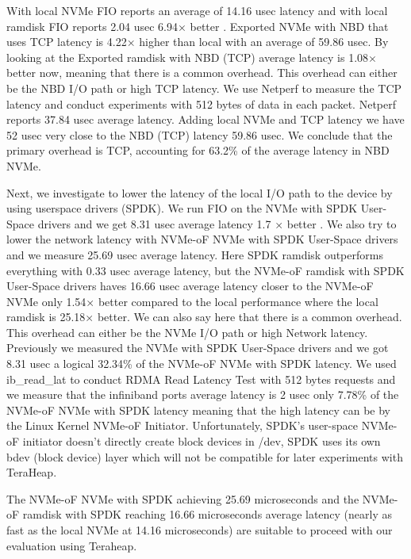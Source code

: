 With local NVMe  FIO reports an average of 14.16 usec  latency and
with local ramdisk FIO reports 2.04 usec 6.94× better . Exported NVMe  with NBD that uses TCP
 latency is 4.22× higher
than local with an average of 59.86 usec. By
looking at the Exported ramdisk with NBD (TCP) average latency  is 1.08$\times$ better now, meaning that
there is a common overhead. This overhead can either be the NBD I/O path or high
TCP latency. We use Netperf to measure the TCP latency and conduct experiments
with 512 bytes of data in each packet. Netperf reports 37.84 usec average
latency. Adding local NVMe and TCP latency we have 52 usec very close to the NBD
(TCP) latency 59.86 usec. We conclude that the primary overhead is TCP,
accounting for 63.2\% of the average latency in NBD NVMe.

Next, we investigate to lower the latency of the local I/O path to the device by
using userspace drivers (SPDK). We run FIO on the NVMe with SPDK User-Space
drivers and we get 8.31 usec average latency 1.7 × better . We also try to lower
the network latency with NVMe-oF NVMe with SPDK User-Space drivers and we
measure 25.69 usec average latency. Here SPDK ramdisk outperforms everything
with 0.33 usec average latency, but the NVMe-oF ramdisk with SPDK User-Space
drivers haves 16.66 usec average latency closer to the NVMe-oF NVMe only 1.54×
better compared to the local performance where the local ramdisk is 25.18×
better. We can also say here that there is a common overhead. This overhead can
either be the NVMe I/O path or high Network latency. Previously we measured the
NVMe with SPDK User-Space drivers and we got 8.31 usec a logical 32.34\% of the
NVMe-oF NVMe with SPDK latency. We used ib\_read\_lat to conduct RDMA Read
Latency Test with 512 bytes requests and we measure that the infiniband ports
average latency is 2 usec only 7.78\% of the NVMe-oF NVMe with SPDK latency
meaning that the high latency can be by the Linux Kernel NVMe-oF Initiator.
Unfortunately, SPDK's user-space NVMe-oF initiator doesn't directly create block
devices in /dev, SPDK uses its own bdev (block device) layer which will not be
compatible for later experiments with TeraHeap. 

The NVMe-oF NVMe with SPDK achieving 25.69 microseconds and the NVMe-oF ramdisk
with SPDK reaching 16.66 microseconds average latency (nearly as fast as the
local NVMe at 14.16 microseconds) are suitable to proceed with our evaluation
using Teraheap.

